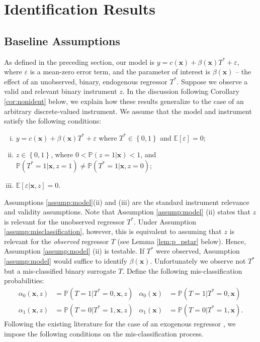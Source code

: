 \section{Identification Results}
\label{sec:identification}

\subsection{Baseline Assumptions}
\label{sec:baseline}
As defined in the preceding section, our model is $y = c(\mathbf{x}) + \beta(\mathbf{x}) T^* + \varepsilon$, where $\varepsilon$ is a mean-zero error term, and the parameter of interest is $\beta(\mathbf{x})$ -- the effect of an unobserved, binary, endogenous regressor $T^*$.
Suppose we observe a valid and relevant binary instrument $z$.
In the discussion following Corollary \ref{cor:nonident} below, we explain how these results generalize to the case of an arbitrary discrete-valued instrument.
We assume that the model and instrument satisfy the following conditions:
\begin{assump} \mbox{}
  \label{assump:model}
  \begin{enumerate}[(i)] 
    \item $y = c(\mathbf{x}) + \beta(\mathbf{x})T^* + \varepsilon$ where $T^* \in \left\{ 0,1 \right\}$ and $\mathbb{E}[\varepsilon]=0$;
    \item  $z \in \left\{ 0,1 \right\}$, where $0 < \mathbb{P}(z=1|\mathbf{x}) < 1$, and $\mathbb{P}(T^*=1|\mathbf{x},z=1) \neq \mathbb{P}(T^*=1|\mathbf{x},z=0)$;
    \item $\mathbb{E}[\varepsilon|\mathbf{x},z] = 0$.
  \end{enumerate}
\end{assump}

Assumptions \ref{assump:model}(ii) and (iii) are the standard instrument relevance and validity assumptions. 
Note that Assumption \ref{assump:model} (ii) states that $z$ is relevant for the unobserved regressor $T^*$. 
Under Assumption \ref{assump:misclassification}, however, this is equivalent to assuming that $z$ is relevant for the \emph{observed} regressor $T$ (see Lemma \ref{lem:p_pstar} below).
Hence, Assumption \ref{assump:model} (ii) is testable.
If $T^*$ were observed, Assumption \ref{assump:model} would suffice to identify  $\beta(\mathbf{x})$.  
Unfortunately we observe not $T^*$ but a mis-classified binary surrogate $T$.  
Define the following mis-classification probabilities:
\begin{align*}
  \alpha_0(\mathbf{x},z) &= \mathbb{P}\left(T=1|T^*=0,\mathbf{x},z  \right) &
  \alpha_0(\mathbf{x}) &= \mathbb{P}\left(T=1|T^*=0,\mathbf{x}  \right)\\ 
  \alpha_1(\mathbf{x},z) &= \mathbb{P}\left(T=0|T^*=1,\mathbf{x},z  \right) &
  \alpha_1(\mathbf{x}) &= \mathbb{P}\left(T=0|T^*=1,\mathbf{x}  \right).
\end{align*}
Following the existing literature for the case of an exogenous regressor \citep{Mahajan,BBS,FL,KRS,Lewbel}, we impose the following conditions on the mis-classification process.

